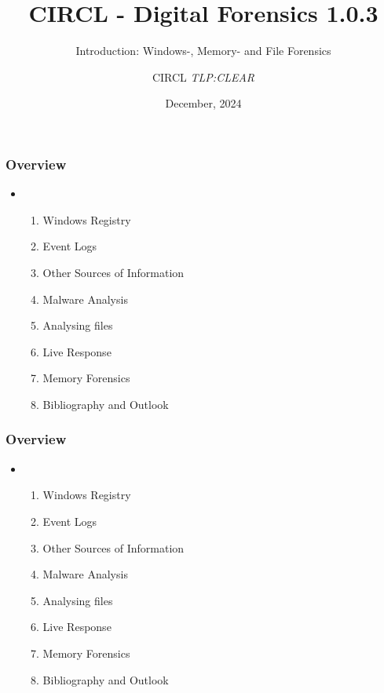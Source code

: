 \documentclass{beamer}
\author{CIRCL \emph{TLP:CLEAR}}
\title{CIRCL - Digital Forensics 1.0.3}
\subtitle{Introduction: Windows-, Memory- and File Forensics}
\institute{info@circl.lu}
\date{December, 2024}
\begin{document}
\begin{frame}[t,plain]
\titlepage
\end{frame}

\begin{frame}
  \frametitle{Overview}
  \begin{itemize}
  \item[]
      \begin{enumerate}
          \item Windows Registry
          \item Event Logs
          \item Other Sources of Information
          \item Malware Analysis
          \item Analysing files
          \item Live Response
          \item Memory Forensics
          \item Bibliography and Outlook
      \end{enumerate}

  \end{itemize}
\end{frame}












\begin{frame}
  \frametitle{Overview}
  \begin{itemize}
  \item[]
      \begin{enumerate}
          \item Windows Registry
          \item Event Logs
          \item Other Sources of Information
          \item Malware Analysis
          \item Analysing files
          \item Live Response
          \item Memory Forensics
          \item Bibliography and Outlook
      \end{enumerate}

  \end{itemize}
\end{frame}
\end{document}
